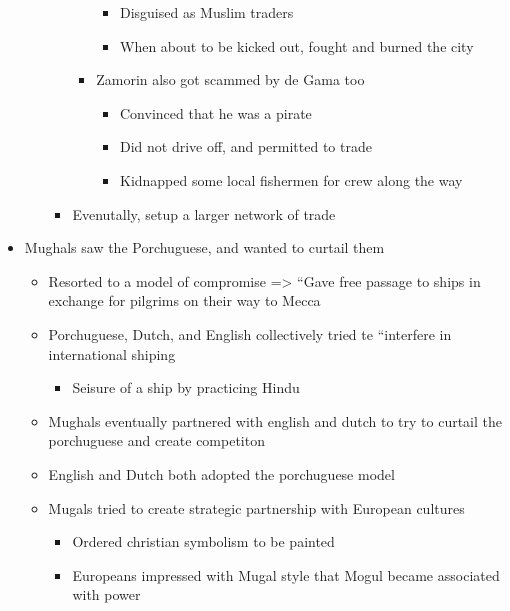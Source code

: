 \documentclass[letterpaper]{article}
\begin{document}
\begin{itemize}
\begin{itemize}
\begin{itemize}
\begin{itemize}
\begin{itemize}
\item Disguised as Muslim traders
\item When about to be kicked out, fought and burned the city
\end{itemize}

\item Zamorin also got scammed by de Gama too

\begin{itemize}
\item Convinced that he was a pirate
\item Did not drive off, and permitted to trade
\item Kidnapped some local fishermen for crew along the way
\end{itemize}
\end{itemize}

\item Evenutally, setup a larger network of trade
\end{itemize}
\end{itemize}

\item Mughals saw the Porchuguese, and wanted to curtail them

\begin{itemize}
\item Resorted to a model of compromise => “Gave free passage to ships in
exchange for pilgrims on their way to Mecca
\item Porchuguese, Dutch, and English collectively tried te “interfere in
international shiping

\begin{itemize}
\item Seisure of a ship by practicing Hindu
\end{itemize}

\item Mughals eventually partnered with english and dutch to try to
curtail the porchuguese and create competiton
\item English and Dutch both adopted the porchuguese model
\item Mugals tried to create strategic partnership with European cultures

\begin{itemize}
\item Ordered christian symbolism to be painted
\item Europeans impressed with Mugal style that Mogul became associated
with power
\end{itemize}
\end{itemize}


\end{itemize}
\end{document}
